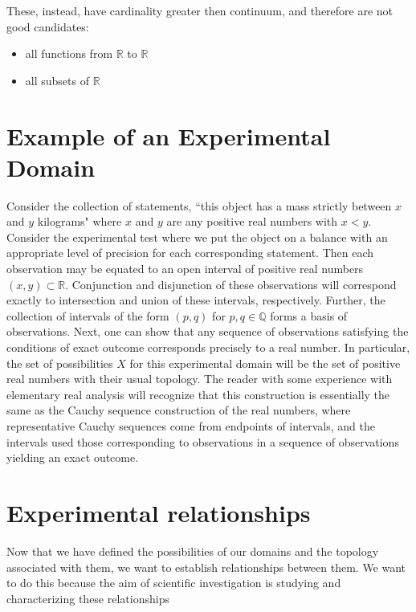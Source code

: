 \documentclass[review]{elsarticle}
\theoremstyle{plain}%
\theoremstyle{definition}
\theoremstyle{remark}
\begin{document}
These, instead, have cardinality greater then continuum, and therefore are not good candidates:
\begin{itemize}
	\item all functions from $\mathbb{R}$ to $\mathbb{R}$
	\item all subsets of $\mathbb{R}$
\end{itemize}




\section{Example of an Experimental Domain}

Consider the collection of statements, ``this object has a mass strictly between $x$ and $y$ kilograms" where $x$ and $y$ are any positive real numbers with $x<y$. Consider the experimental test where we put the object on a balance with an appropriate level of precision for each corresponding statement. Then each observation may be equated to an open interval of positive real numbers $(x,y)\subset\mathbb{R}$. Conjunction and disjunction of these observations will correspond exactly to intersection and union of these intervals, respectively. Further, the collection of intervals of the form $(p,q)$ for $p,q\in\mathbb{Q}$ forms a basis of observations. Next, one can show that any sequence of observations satisfying the conditions of exact outcome corresponds precisely to a real number. In particular, the set of possibilities $X$ for this experimental domain will be the set of positive real numbers with their usual topology. The reader with some experience with elementary real analysis will recognize that this construction is essentially the same as the Cauchy sequence construction of the real numbers, where representative Cauchy sequences come from endpoints of intervals, and the intervals used those corresponding to observations in a sequence of observations yielding an exact outcome. 





\section{Experimental relationships}

Now that we have defined the possibilities of our domains and the topology associated with them, we want to establish relationships between them. We want to do this because the aim of scientific investigation is studying and characterizing these relationships
\end{document}
